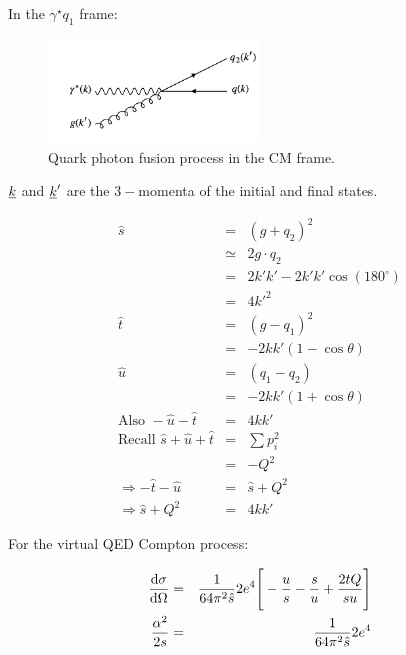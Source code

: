 In the $\gamma^{\star}q_1$ frame:

\begin{figure}[!htb]
  \begin{center}
    \includegraphics[width=0.5\textwidth]{images/web_feynman/image_71.png}
    \caption[CM quark photon fusion process]{Quark photon fusion process in the CM frame.}
    \label{fig:ch14_QGammaToQGCM}
  \end{center}
\end{figure}

$\underline{k}$ and $\underline{k}'$ are the $3-$momenta of the initial and final states.

\begin{eqnarray*}
  \hat{s} & = & \left(g + q_2\right)^2 \\
  & \simeq & 2g \cdot q_2 \\
  & = & 2k'k' - 2k'k'\cos(180^{\circ}) \\
  & = & 4k'^2 \\
  \hat{t} & = & \left(g - q_1\right)^2 \\
  & = & -2kk'\left(1 - \cos\theta\right) \\
  \hat{u} & = & \left(q_1 - q_2\right) \\
  & = & -2kk'\left(1 + \cos\theta\right) \\
  \textrm{Also } -\hat{u} - \hat{t} & = & 4kk' \\
  \textrm{Recall } \hat{s} + \hat{u} + \hat{t} & = & \sum p_i^2 \\
  & = & -Q^2 \\
  \Rightarrow - \hat{t} - \hat{u} & = & \hat{s} + Q^2 \\
  \Rightarrow \hat{s} + Q^2 & = & 4kk'
\end{eqnarray*}

For the virtual QED Compton process:

\begin{eqnarray*}
  \frac{\mathrm{d}\sigma}{\mathrm{d}\Omega} & = & \frac{1}{64\pi^2\hat{s}}2e^4\Bigg[ -\frac{u}{s} - \frac{s}{u} + \frac{2tQ}{su} \Bigg] \\
  \frac{\alpha^2}{2s} & = & \frac{1}{64\pi^2\hat{s}}2e^4
\end{eqnarray*}


